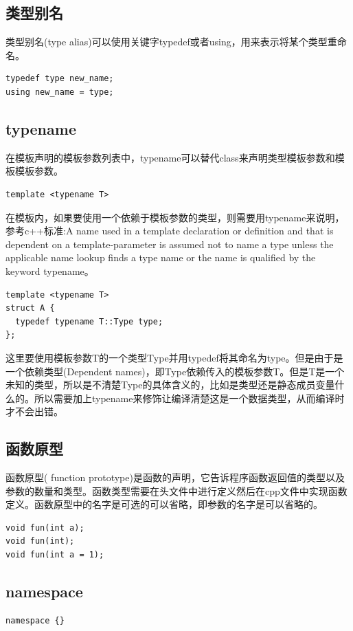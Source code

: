 \documentclass[12pt]{book}
\begin{document}
\subsection{类型别名}
类型别名(type alias)可以使用关键字typedef或者using，用来表示将某个类型重命名。
\begin{lstlisting}
typedef type new_name;
using new_name = type;
\end{lstlisting}

\subsection{typename}
在模板声明的模板参数列表中，typename可以替代class来声明类型模板参数和模板模板参数。
\begin{lstlisting}
template <typename T>
\end{lstlisting}
在模板内，如果要使用一个依赖于模板参数的类型，则需要用typename来说明，参考c++标准:A name used in a template declaration or definition and that is dependent on a template-parameter is assumed not to name a type unless the applicable name lookup finds a type name or the name is qualified by the keyword typename。
\begin{lstlisting}
template <typename T>
struct A {
  typedef typename T::Type type;
};
\end{lstlisting}
这里要使用模板参数T的一个类型Type并用typedef将其命名为type。但是由于是一个依赖类型(Dependent names)，即Type依赖传入的模板参数T。但是T是一个未知的类型，所以是不清楚Type的具体含义的，比如是类型还是静态成员变量什么的。所以需要加上typename来修饰让编译清楚这是一个数据类型，从而编译时才不会出错。

\subsection{函数原型}
函数原型( function prototype)是函数的声明，它告诉程序函数返回值的类型以及参数的数量和类型。函数类型需要在头文件中进行定义然后在cpp文件中实现函数定义。函数原型中的名字是可选的可以省略，即参数的名字是可以省略的。
\begin{lstlisting}
void fun(int a);
void fun(int);
void fun(int a = 1);
\end{lstlisting}

\subsection{namespace}
\begin{lstlisting}
namespace {}
\end{lstlisting}
\end{document}
